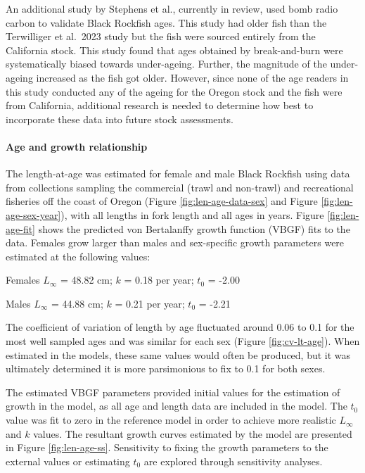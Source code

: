 \documentclass[11pt,
  english,
  letterpaper,
]{article}
\begin{document}
An additional study by Stephens et al., currently in review, used bomb radio carbon to validate Black Rockfish ages. This study had older fish than the Terwilliger et al.~2023 study but the fish were sourced entirely from the California stock. This study found that ages obtained by break-and-burn were systematically biased towards under-ageing. Further, the magnitude of the under-ageing increased as the fish got older. However, since none of the age readers in this study conducted any of the ageing for the Oregon stock and the fish were from California, additional research is needed to determine how best to incorporate these data into future stock assessments.

\hypertarget{age-and-growth-relationship}{%
\paragraph{Age and growth relationship}\label{age-and-growth-relationship}}

The length-at-age was estimated for female and male Black Rockfish using data from collections sampling the commercial (trawl and non-trawl) and recreational fisheries off the coast of Oregon (Figure \ref{fig:len-age-data-sex} and Figure \ref{fig:len-age-sex-year}), with all lengths in fork length and all ages in years. Figure \ref{fig:len-age-fit} shows the predicted von Bertalanffy growth function (VBGF) fits to the data. Females grow larger than males and sex-specific growth parameters were estimated at the following values:

\begin{centering}

Females $L_{\infty}$ = 48.82 cm; $k$ = 0.18 per year; $t_0$ = -2.00

Males $L_{\infty}$ = 44.88 cm; $k$ = 0.21 per year; $t_0$ = -2.21

\end{centering}

\vspace{0.5cm}

The coefficient of variation of length by age fluctuated around 0.06 to 0.1 for the most well sampled ages and was similar for each sex (Figure \ref{fig:cv-lt-age}). When estimated in the models, these same values would often be produced, but it was ultimately determined it is more parsimonious to fix to 0.1 for both sexes.

The estimated VBGF parameters provided initial values for the estimation of growth in the model, as all age and length data are included in the model. The \(t_0\) value was fit to zero in the reference model in order to achieve more realistic \(L_{\infty}\) and \(k\) values. The resultant growth curves estimated by the model are presented in Figure \ref{fig:len-age-ss}. Sensitivity to fixing the growth parameters to the external values or estimating \(t_0\) are explored through sensitivity analyses.
\end{document}
